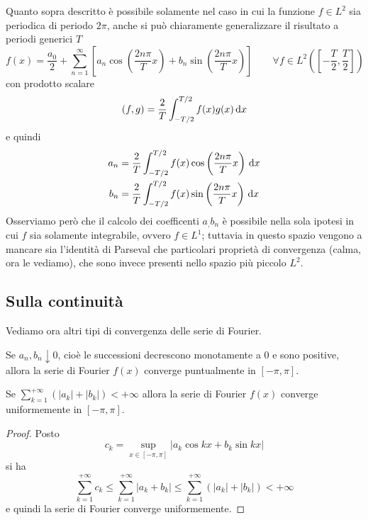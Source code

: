 \begin{rem}
Quanto sopra descritto è possibile solamente nel caso in cui la funzione $f\in L^2$ sia periodica di periodo $2\pi$, anche si può chiaramente generalizzare il risultato a periodi generici $T$
\begin{equation*}
f(x) = \frac{a_{0}}{2} + \sum\limits^{\infty}_{n = 1}\left[a_{n}\cos\left(\frac{2n\pi}{T} x\right) + b_{n}\sin\left(\frac{2n\pi}{T} x\right)\right] \qquad \forall f\in L^{2}\left(\left[ - \frac{T}{2}, \frac{T}{2}\right]\right)
\end{equation*}
con prodotto scalare
\begin{equation*}
(f, g) = \frac{2}{T}\int^{T/2}_{- T/2} f(x) g(x) \, \mathrm{d} x
\end{equation*}
e quindi
\begin{align*}
a_{n} &= \frac{2}{T}\int^{T/2}_{- T/2} f(x)\cos\left(\frac{2n\pi}{T} x\right) \, \mathrm{d} x \\
b_{n} &= \frac{2}{T}\int^{T/2}_{- T/2} f(x)\sin\left(\frac{2n\pi}{T} x\right) \, \mathrm{d} x
\end{align*}
Osserviamo però che il calcolo dei coefficenti $a_,b_n$ è possibile nella sola ipotesi in cui $f$ sia solamente integrabile, ovvero $f\in L^1$; tuttavia in questo spazio vengono a mancare sia l'identità di Parseval che particolari proprietà di convergenza (calma, ora le vediamo), che sono invece presenti nello spazio più piccolo $L^2$.
\end{rem}

\subsection{Sulla continuità}

Vediamo ora altri tipi di convergenza delle serie di Fourier.

\begin{thm}
Se $a_n,b_n\downarrow0$, cioè le successioni decrescono monotamente a 0 e sono positive, allora la serie di Fourier $f(x)$ converge puntualmente in $[-\pi,\pi]$.
\end{thm}

\begin{thm}
Se $\displaystyle\sum_{k=1}^{+\infty}\left(|a_k|+|b_k|\right)<+\infty$ allora la serie di Fourier $f(x)$ converge uniformemente in $[-\pi,\pi]$.
\end{thm}
\begin{proof}
Posto 
$$
c_k=\sup_{x\in[-\pi,\pi]} |a_k\cos kx+b_k\sin kx|
$$
si ha
$$
\sum_{k=1}^{+\infty} c_k \leq \sum_{k=1}^{+\infty} |a_k+b_k| \leq \sum_{k=1}^{+\infty}\left(|a_k|+|b_k|\right)<+\infty 
$$
e quindi la serie di Fourier converge uniformemente.
\end{proof}

